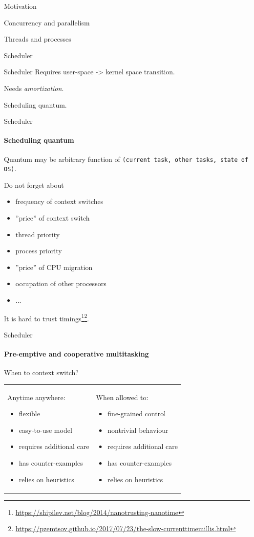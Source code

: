 \begin{section}{Motivation}
\begin{section}{Concurrency and parallelism}
\begin{section}{Threads and processes}
\begin{section}{Scheduler}
\begin{frame}{Scheduler}
Requires user-space -> kernel space transition.

\pause
Needs \textit{amortization}.

\pause
Scheduling quantum.

\end{frame}


\begin{frame}{Scheduler}
\framesubtitle{Scheduling quantum}

Quantum may be arbitrary function of \texttt{(current task, other tasks, state of OS)}.

Do not forget about
\begin{itemize}
    \item frequency of context switches
    \item ''price'' of context switch
    \item thread priority
    \item process priority
    \item ''price'' of CPU migration 
    \item occupation of other processors
    \item ...
\end{itemize}

It is hard to trust timings\footnote{\url{https://shipilev.net/blog/2014/nanotrusting-nanotime}}\footnote{\url{https://pzemtsov.github.io/2017/07/23/the-slow-currenttimemillis.html}}.

\end{frame}

\begin{frame}{Scheduler}
\framesubtitle{Pre-emptive and cooperative multitasking}

When to context switch?

\begin{tabular}{p{8cm}p{5cm}}

    Anytime anywhere:
    \begin{itemize}
        \item flexible
        \item easy-to-use model
        \item requires additional care
        \item has counter-examples
        \item relies on heuristics
    \end{itemize}

 &     
    When allowed to:
    \begin{itemize}
        \item fine-grained control
        \item nontrivial behaviour
        \item requires additional care
        \item has counter-examples
        \item relies on heuristics
    \end{itemize}
\end{tabular}


\end{frame}
\end{section}
\end{section}
\end{section}
\end{section}
